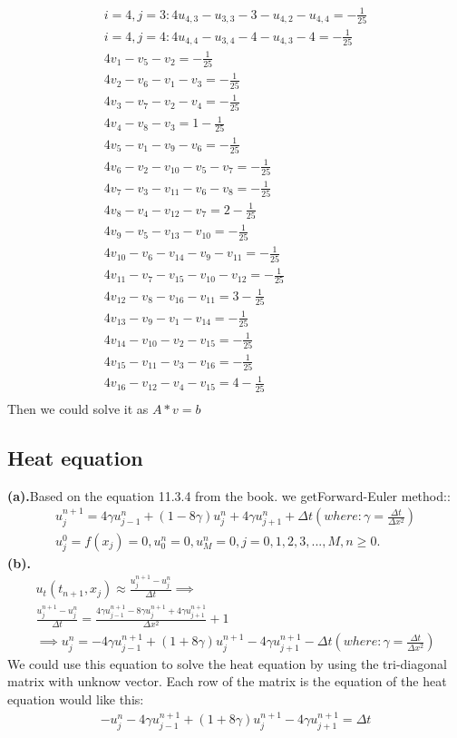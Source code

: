 \[\begin{aligned}
i=4,j=3:4u_{4,3}-u_{3,3}-3-u_{4,2}-u_{4,4}=-\frac{1}{25}\\
i=4,j=4:4u_{4,4}-u_{3,4}-4-u_{4,3}-4=-\frac{1}{25}\\
4v_1-v_5-v_2=-\frac{1}{25}\\
4v_2-v_6-v_1-v_3=-\frac{1}{25}\\
4v_3-v_7-v_2-v_4=-\frac{1}{25}\\
4v_4-v_8-v_3=1-\frac{1}{25}\\
4v_5-v_1-v_9-v_6=-\frac{1}{25}\\
4v_6-v_2-v_10-v_5-v_7=-\frac{1}{25}\\
4v_7-v_3-v_11-v_6-v_8=-\frac{1}{25}\\
4v_8-v_4-v_12-v_7=2-\frac{1}{25}\\
4v_9-v_5-v_13-v_10=-\frac{1}{25}\\
4v_10-v_6-v_14-v_9-v_11=-\frac{1}{25}\\
4v_11-v_7-v_15-v_10-v_12=-\frac{1}{25}\\
4v_12-v_8-v_16-v_11=3-\frac{1}{25}\\
4v_13-v_9-v_1-v_14=-\frac{1}{25}\\
4v_14-v_10-v_2-v_15=-\frac{1}{25}\\
4v_15-v_11-v_3-v_16=-\frac{1}{25}\\
4v_16-v_12-v_4-v_15=4-\frac{1}{25}\\
\end{aligned}\]Then we could solve it as $A*v=b$
\newpage
\subsection{Heat equation}
\textbf{(a).}Based on the equation 11.3.4 from the book. we getForward-Euler method::
\[\begin{aligned}
u_j^{n+1}=4\gamma u_{j-1}^n+(1-8\gamma)u_j^n+4\gamma u_{j+1}^n+\Delta t(where:\gamma=\frac{\Delta t}{\Delta x^2})\\
u_j^0=f(x_j)=0,u_0^n=0,u_M^n=0,j=0,1,2,3,...,M,n\geq 0.
\end{aligned}\]
\textbf{(b).}
\[\begin{aligned}
  u_t(t_{n+1},x_j)\approx \frac{u_j^{n+1}-u_j^n}{\Delta t}\implies\\
  \frac{u_j^{n+1}-u_j^n}{\Delta t}=\frac{4\gamma u_{j-1}^{n+1}-8\gamma u_j^{n+1}+4\gamma u_{j+1}^{n+1}}{\Delta x^2}+1\\
  \implies u_j^n=-4\gamma u_{j-1}^{n+1}+(1+8\gamma) u_j^{n+1}-4\gamma u_{j+1}^{n+1}-\Delta t(where:\gamma=\frac{\Delta t}{\Delta x^2})
\end{aligned}\]We could use this equation to solve the heat equation by using the tri-diagonal matrix with unknow vector.
Each row of the matrix is the equation of the heat equation would like this:
\[\begin{aligned}
  -u_j^n-4\gamma u_{j-1}^{n+1}+(1+8\gamma) u_j^{n+1}-4\gamma u_{j+1}^{n+1}=\Delta t
\end{aligned}\]
\newpage
